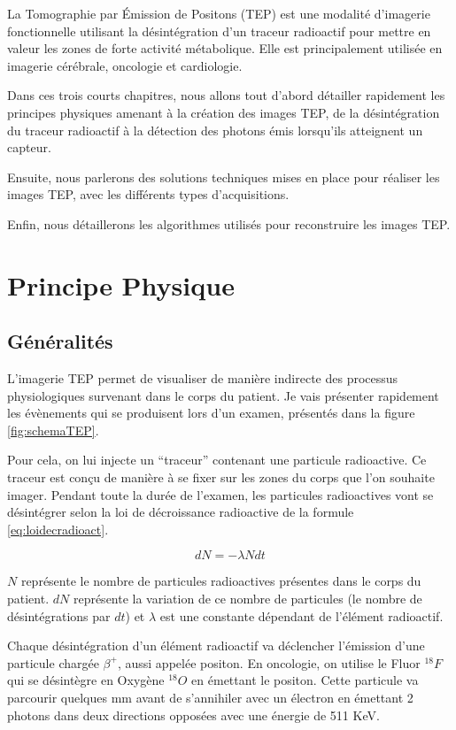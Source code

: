 
\label{lab:chapPET}
La Tomographie par \'Emission de Positons (TEP) est une modalité d'imagerie fonctionnelle utilisant la désintégration d'un traceur radioactif pour mettre en valeur les zones de forte activité métabolique. Elle est principalement utilisée en imagerie cérébrale, oncologie et cardiologie.

Dans ces trois courts chapitres, nous allons tout d'abord détailler rapidement les principes physiques amenant à la création des images TEP, de la désintégration du traceur radioactif à la détection des photons émis lorsqu'ils atteignent un capteur. 

Ensuite, nous parlerons des solutions techniques mises en place pour réaliser les images TEP, avec les différents types d'acquisitions.

Enfin, nous détaillerons les algorithmes utilisés pour reconstruire les images TEP.

 
\chapter{Principe Physique}

	\section{Généralités}

L'imagerie TEP permet de visualiser de manière indirecte des processus physiologiques survenant dans le corps du patient. Je vais présenter rapidement les évènements qui se produisent lors d'un examen, présentés dans la figure \ref{fig:schemaTEP}.

Pour cela, on lui injecte un ``traceur'' contenant une particule radioactive. Ce traceur est conçu de manière à se fixer sur les zones du corps que l'on souhaite imager. Pendant toute la durée de l'examen, les particules radioactives vont se désintégrer selon la loi de décroissance radioactive de la formule \ref{eq:loidecradioact}.

\begin{equation}
	dN = - \lambda N dt
	\label{eq:loidecradioact}
\end{equation}

$N$ représente le nombre de particules radioactives présentes dans le corps du patient. $dN$ représente la variation de ce nombre de particules (le nombre de désintégrations par $dt$) et $\lambda$ est une constante dépendant de l'élément radioactif.

Chaque désintégration d'un élément radioactif va déclencher l'émission d'une particule chargée $\beta^+$, aussi appelée positon. En oncologie, on utilise le Fluor $^{18}F$ qui se désintègre en Oxygène $^{18}O$ en émettant le positon. Cette particule va parcourir quelques mm avant de s'annihiler avec un électron en émettant 2 photons dans deux directions opposées avec une énergie de 511 KeV.

